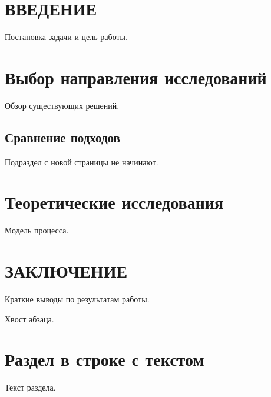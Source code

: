 

\section*{ВВЕДЕНИЕ}

Постановка задачи и цель работы.

\section{Выбор направления исследований} %

Обзор существующих решений.

\subsection{Сравнение подходов}

Подраздел с новой страницы не начинают.

\newpage
\section{Теоретические исследования}

Модель процесса.

\section*{ЗАКЛЮЧЕНИЕ} %

Краткие выводы по результатам работы.



Хвост абзаца. \section{Раздел в строке с текстом} %
Текст раздела.
